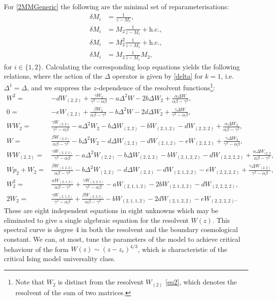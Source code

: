 For \eqref{2MMGeneric} the following are the minimal set of reparameterisations:
%
\begin{align}
    \label{2MMGenericReps}
    \delta M_{i} & = \frac{1}{z-M_1}, \\
    \delta M_{i} & = M_2 \frac{1}{z-M_1} + \text{h.c.}, \\
    \delta M_{i} & = M_2^2 \frac{1}{z-M_1}+\text{h.c.}, \\
    \delta M_{i} & = M_2 \frac{1}{z-M_1} M_2,
\end{align}
%
for $i\in\{1,2\}$. Calculating the corresponding loop equations yields the following relations,
where the action of the $\Delta$ operator is given by \eqref{delta} for $k=1$, i.e.
$\Delta^1=\Delta$, and we suppress the $z$-dependence of the resolvent functions\footnote{Note that
    $W_2$ is distinct from the resolvent $W_{(2)}$ \eqref{eq2}, which denotes the resolvent of the sum
    of two matrices.}:
%
\begin{align}
    W^2 =             & -d W_{(2,2)}+\frac{\gamma  W_{2}}{\gamma ^2-\alpha  \beta }-a\Delta^2 W -2b \Delta W_{2} +\frac{\alpha \Delta W}{\alpha  \beta -\gamma ^2}, \\
    0 =               & -e W _{(2,2)}+\frac{\beta  W_{2}}{\alpha  \beta -\gamma ^2} - b\Delta^2 W  - 2d\Delta W_{2}+\frac{\gamma \Delta W}{\gamma ^2-\alpha  \beta }, \\
    W  W_{2} =        & \frac{\gamma  W_{(2,2)}}{\gamma ^2-\alpha  \beta }-a\Delta^2 W_{2} -b \Delta W_{(2,2)} -b W_{(2,1,2)}-d W_{(2,2,2)}+\frac{\alpha  \Delta W_{2}}{\alpha  \beta -\gamma ^2}, \\
    W =               & \frac{\beta  W_{(2,2)}}{\alpha  \beta -\gamma ^2}-b \Delta^2 W_{2}-d\Delta W_{(2,2)}-d W_{(2,1,2)}-e W_{(2,2,2)}+\frac{\gamma \Delta W_{2}}{\gamma ^2-\alpha  \beta }, \\
    W  W_{(2,2)} =    & \frac{\gamma  W_{(2,2,2)}}{\gamma ^2-\alpha  \beta }-a\Delta^2 W_{(2,2)}-b\Delta W_{(2,2,2)}-b W_{(2,1,2,2)}-d W_{(2,2,2,2)}+\frac{\alpha  \Delta W_{(2,2}}{\alpha  \beta -\gamma ^2}, \\
    W  p_{2}+ W_{2} = & \frac{\beta  W_{(2,2,2)}}{\alpha  \beta -\gamma ^2}-b\Delta^2 W_{(2,2)}-d\Delta W_{(2,2)}-d W_{(2,1,2,2)} -e W_{(2,2,2,2)}+\frac{\gamma \Delta W_{(2,2)}}{\gamma ^2-\alpha  \beta }, \\
    W_{2}^2 =         & \frac{\alpha  W_{(2,1,2)}}{\alpha  \beta -\gamma ^2}+\frac{\gamma  W_{(2,2,2)}}{\gamma ^2-\alpha  \beta }-a W_{(2,1,1,2)}-2 b W_{(2,1,2,2)}-d W _{(2,2,2,2)}, \\
    2 W_{2} =         & \frac{\gamma  W_{(2,1,2)}}{\gamma ^2-\alpha  \beta }+\frac{\beta  W_{(2,2,2)}}{\alpha  \beta -\gamma ^2}-b W_{(2,1,1,2)}-2 d W_{(2,1,2,2)}-e W_{(2,2,2,2)}.
\end{align}
%
These are eight independent equations in eight unknowns which may be eliminated to give a single
algebraic equation for the resolvent $W(z)$. This spectral curve is degree 4 in both the resolvent
and the boundary cosmological constant. We can, at most, tune the parameters of the model to
achieve critical behaviour of the form $W(z)\sim(z-z_c)^{4/3}$, which is characteristic of the
critical Ising model universality class.


